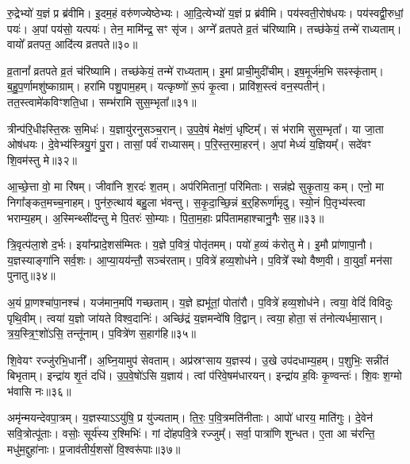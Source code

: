 रु॒द्रेभ्यो॑ य॒ज्ञं प्र ब्र॑वीमि।
इ॒दम॒हं वरु॑णज्येष्ठेभ्यः।
आ॒दि॒त्येभ्यो॑ य॒ज्ञं प्र ब्र॑वीमि।
पय॑स्वती॒रोष॑धयः।
पय॑स्वद्वी॒रुधां॒ पयः॑।
अ॒पां पय॑सो॒ यत्पयः॑।
तेन॒ मामि॑न्द्र॒ सꣳ सृ॑ज।
अग्ने᳚ व्रतपते व्र॒तं च॑रिष्यामि।
तच्छ॑केयं॒ तन्मे॑ राध्यताम्।
वायो᳚ व्रतपत॒ आदि॑त्य व्रतपते॥३०॥\ip

व्र॒तानां᳚ व्रतपते व्र॒तं च॑रिष्यामि।
तच्छ॑केयं॒ तन्मे॑ राध्यताम्।
इ॒मां प्राची॒मुदी॑चीम्।
इष॒मूर्ज॑म॒भि सꣴस्कृ॑ताम्।
ब॒हु॒प॒र्णामशु॑ष्काग्राम्।
हरा॑मि पशु॒पाम॒हम्।
यत्कृष्णो॑ रू॒पं कृ॒त्वा।
प्रावि॑श॒स्त्वं वन॒स्पतीन्॑।
तत॒स्त्वामे॑कविꣳशति॒धा।
सम्भ॑रामि सुस॒म्भृता᳚॥३१॥\ip

त्रीन्प॑रि॒धीꣴस्ति॒स्रः स॒मिधः॑।
य॒ज्ञायु॑रनु\-सञ्च॒रान्।
उ॒प॒वे॒षं मेक्ष॑णं॒ धृष्टिम्᳚।
सं भ॑रामि सुस॒म्भृता᳚।
या जा॒ता ओष॑धयः।
दे॒वेभ्य॑स्त्रियु॒गं पु॒रा।
तासां॒ पर्व॑ राध्यासम्।
प॒रि॒स्त॒रमा॒हरन्॑।
अ॒पां मेध्यं॑ य॒ज्ञियम्᳚।
सदे॑वꣳ शि॒वम॑स्तु मे॥३२॥\ip

आ॒च्छे॒त्ता वो॒ मा रि॑षम्।
जीवा॑नि श॒रदः॑ श॒तम्।
अप॑रिमितानां॒ परि॑मिताः।
सन्न॑ह्ये सुकृ॒ताय॒ कम्।
एनो॒ मा निगा᳚ङ्कत॒मच्च॒नाहम्।
पुन॑रु॒त्थाय॑ बहु॒ला भ॑वन्तु।
स॒कृ॒दा॒च्छि॒न्नं ब॒र्॒हिरूर्णा॑मृदु।
स्यो॒नं पि॒तृभ्य॑स्त्वा भराम्य॒हम्।
अ॒स्मिन्थ्सी॑दन्तु मे पि॒तरः॑ सो॒म्याः।
पि॒ता॒म॒हाः प्रपि॑तामहाश्चानु॒गैः स॒ह॥३३॥\ip

त्रि॒वृत्प॑ला॒शे द॒र्भः।
इया᳚न्प्रादे॒शस॑म्मितः।
य॒ज्ञे प॒वित्रं॒ पोतृ॑तमम्।
पयो॑ ह॒व्यं क॑रोतु मे।
इ॒मौ प्रा॑णापा॒नौ।
य॒ज्ञस्याङ्गा॑नि सर्व॒शः।
आ॒प्या॒यय॑न्तौ॒ सञ्च॑रताम्।
प॒वित्रे॑ हव्य॒शोध॑ने।
प॒वित्रे᳚ स्थो वैष्ण॒वी।
वा॒युर्वां॒ मन॑सा पुनातु॥३४॥\ip

अ॒यं प्रा॒णश्चा॑पा॒नश्च॑।
यज॑मान॒मपि॑ गच्छताम्।
य॒ज्ञे ह्यभू॑तां॒ पोता॑रौ।
प॒वित्रे॑ हव्य॒शोध॑ने।
त्वया॒ वेदिं॑ विविदुः पृथि॒वीम्।
त्वया॑ य॒ज्ञो जा॑यते विश्व॒दानिः॑।
अच्छि॑द्रं य॒ज्ञमन्वे॑षि वि॒द्वान्।
त्वया॒ होता॒ सं त॑नोत्यर्धमा॒सान्।
त्र॒य॒स्त्रि॒ꣳ॒शो॑ऽसि॒ तन्तू॑नाम्।
प॒वित्रे॑ण स॒हाग॑हि॥३५॥\ip

शि॒वेयꣳ रज्जु॑रभि॒धानी᳚।
अ॒घ्नि॒यामुप॑ सेवताम्।
अप्र॑स्रꣳसाय य॒ज्ञस्य॑।
उ॒खे उप॑दधाम्य॒हम्।
प॒शुभिः॒ सन्नी॑तं बिभृताम्।
इन्द्रा॑य शृ॒तं दधि॑।
उ॒प॒वे॒षो॑ऽसि य॒ज्ञाय॑।
त्वां प॑रिवे॒षम॑धारयन्।
इन्द्रा॑य ह॒विः कृ॒ण्वन्तः॑।
शि॒वः श॒ग्मो भ॑वासि नः॥३६॥\ip

अमृ॑न्मयन्देवपा॒त्रम्।
य॒ज्ञस्याऽऽयु॑षि॒ प्र यु॑ज्यताम्।
ति॒रः॒ प॒वि॒त्रमति॑नीताः।
आपो॑ धारय॒ माति॑गुः।
दे॒वेन॑ सवि॒त्रोत्पू॑ताः।
वसोः॒ सूर्य॑स्य र॒श्मिभिः॑।
गां दो॑हपवि॒त्रे रज्जुम्᳚।
सर्वा॒ पात्रा॑णि शुन्धत।
ए॒ता आ च॑रन्ति॒ मधु॑म॒द्दुहा॑नाः।
प्र॒जाव॑तीर्य॒शसो॑ वि॒श्वरू॑पाः॥३७॥\ip

